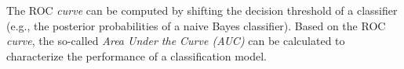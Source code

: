 \documentclass{article}
\begin{document}
\noindent The ROC \emph{curve} can be computed by shifting the decision threshold of a classifier (e.g., the posterior probabilities of a naive Bayes classifier). Based on the  ROC \emph{curve}, the so-called \emph{Area Under the Curve (AUC)} can be calculated to characterize the performance of a classification model.


\newpage

{}

\end{document}
